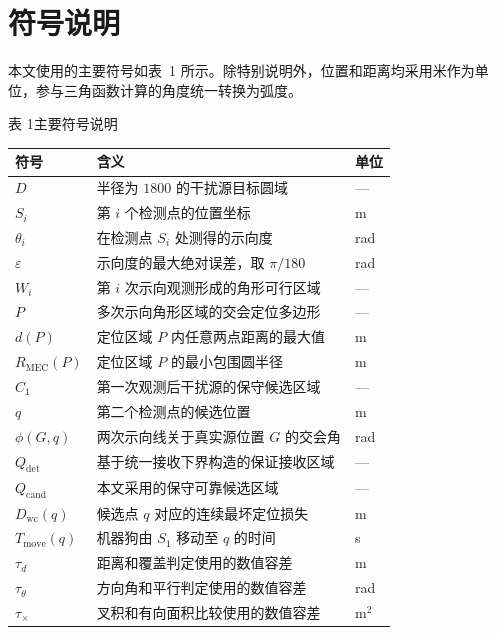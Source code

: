 \clearpage
\section{符号说明}

本文使用的主要符号如表~1 所示。除特别说明外，位置和距离均采用米作为单位，参与三角函数计算的角度统一转换为弧度。

\begin{center}
  {\fontsize{12pt}{14.4pt}\heiti 表 1\quad 主要符号说明}\\[0.6em]
  \renewcommand{\arraystretch}{1.25}
  \begin{tabular}{>{\centering\arraybackslash}p{2.3cm}p{9.0cm}>{\centering\arraybackslash}p{2.0cm}}
    \toprule
    \textbf{符号} & \centering\textbf{含义} & \textbf{单位} \\
    \midrule
    $D$ & 半径为 $1800$ 的干扰源目标圆域 & --- \\
    $S_i$ & 第 $i$ 个检测点的位置坐标 & m \\
    $\theta_i$ & 在检测点 $S_i$ 处测得的示向度 & rad \\
    $\varepsilon$ & 示向度的最大绝对误差，取 $\pi/180$ & rad \\
    $W_i$ & 第 $i$ 次示向观测形成的角形可行区域 & --- \\
    $P$ & 多次示向角形区域的交会定位多边形 & --- \\
    $d(P)$ & 定位区域 $P$ 内任意两点距离的最大值 & m \\
    $R_{\mathrm{MEC}}(P)$ & 定位区域 $P$ 的最小包围圆半径 & m \\
    $C_1$ & 第一次观测后干扰源的保守候选区域 & --- \\
    $q$ & 第二个检测点的候选位置 & m \\
    $\phi(G,q)$ & 两次示向线关于真实源位置 $G$ 的交会角 & rad \\
    $Q_{\mathrm{det}}$ & 基于统一接收下界构造的保证接收区域 & --- \\
    $Q_{\mathrm{cand}}$ & 本文采用的保守可靠候选区域 & --- \\
    $D_{\mathrm{wc}}(q)$ & 候选点 $q$ 对应的连续最坏定位损失 & m \\
    $T_{\mathrm{move}}(q)$ & 机器狗由 $S_1$ 移动至 $q$ 的时间 & s \\
    $\tau_d$ & 距离和覆盖判定使用的数值容差 & m \\
    $\tau_\theta$ & 方向角和平行判定使用的数值容差 & rad \\
    $\tau_\times$ & 叉积和有向面积比较使用的数值容差 & $\mathrm{m}^2$ \\
    \bottomrule
  \end{tabular}
\end{center}
